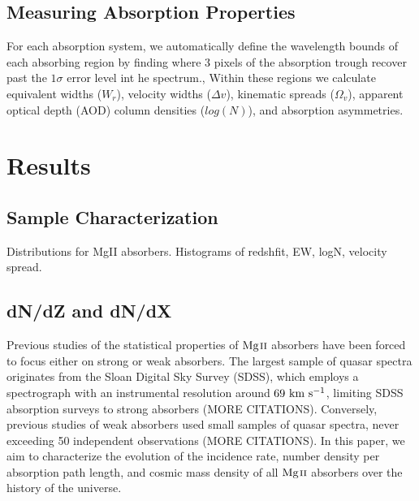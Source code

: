 \message{ !name(Paper_v1.tex)}\documentclass[iop,apj,numberedappendix,appendixfloats,twocolappendix]{emulateapj}
\begin{document}

\subsection{Measuring Absorption Properties}
\label{sec:measuring}

For each absorption system, we automatically define the wavelength bounds of each absorbing region by finding where 3 pixels of the absorption trough recover past the $1\sigma$ error level int he spectrum., Within these regions we calculate equivalent widths ($W_r$), velocity widths ($\Delta v$), kinematic spreads ($\Omega_v$), apparent optical depth (AOD) column densities ($log(N)$), and absorption asymmetries. 



\section{Results}
\label{sec:results}

\subsection{Sample Characterization}
\label{sec:sample}


Distributions for MgII absorbers. Histograms of redshfit, EW, logN, velocity spread.

\subsection{dN/dZ and dN/dX}
\label{dndzdndx}

Previous studies of the statistical properties of ${\hbox{{\rm Mg}\kern 0.1em{\sc ii}}}$ absorbers have been forced to focus either on strong or weak absorbers. The largest sample of quasar spectra originates from the Sloan Digital Sky Survey (SDSS), which employs a spectrograph with an instrumental resolution around $69~\hbox{km~s$^{-1}$}$, limiting SDSS absorption surveys to strong absorbers \citep{Zhu2013,Cooksey2013} (MORE CITATIONS). Conversely, previous studies of weak absorbers used small samples of quasar spectra, never exceeding 50 independent observations \citep{Kacprzak2011} (MORE CITATIONS). In this paper, we aim to characterize the evolution of the incidence rate, number density per absorption path length, and cosmic mass density of all ${\hbox{{\rm Mg}\kern 0.1em{\sc ii}}}$ absorbers over the history of the universe.
\end{document}
